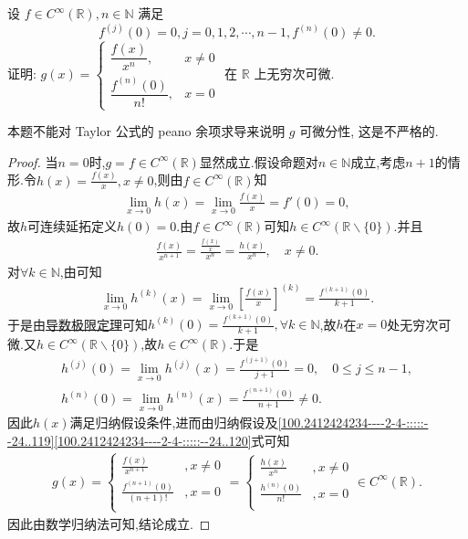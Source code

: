 \documentclass[../../main.tex]{subfiles}%
\begin{document}
\begin{example}
设 $f \in C^\infty(\mathbb{R}), n \in \mathbb{N}$ 满足
\[
f^{(j)}(0) = 0, j = 0, 1, 2, \cdots, n - 1, f^{(n)}(0) \neq 0.
\]
证明: \( g(x) = \begin{cases} 
\dfrac{f(x)}{x^n}, & x \neq 0 \\
\dfrac{f^{(n)}(0)}{n!}, & x = 0 
\end{cases} \) 在 $\mathbb{R}$ 上无穷次可微.
\end{example}
\begin{note}
本题不能对 Taylor 公式的 peano 余项求导来说明 $g$ 可微分性, 这是不严格的.
\end{note}
\begin{proof}
当$n=0$时,$g=f\in C^{\infty}(\mathbb{R})$显然成立.假设命题对$n\in \mathbb{N}$成立,考虑$n+1$的情形.令$h(x)=\frac{f(x)}{x},x\neq 0$,则由$f\in C^{\infty}(\mathbb{R})$知
\begin{align*}
\lim_{x\to 0}h(x)=\lim_{x\to 0}\frac{f(x)}{x} = f'(0)=0,
\end{align*}
故$h$可连续延拓定义$h(0)=0$.由$f\in C^{\infty}(\mathbb{R})$可知$h\in C^{\infty}(\mathbb{R}\backslash \{0\})$.并且
\begin{align}
\frac{f(x)}{x^{n+1}}=\frac{\frac{f(x)}{x}}{x^n}=\frac{h(x)}{x^n},\quad x\neq 0. \label{100.2412424234----2-4-:::::--24..119}
\end{align}
对$\forall k\in \mathbb{N}$,由可知
\begin{align*}
\lim_{x\rightarrow 0}h^{(k)}(x)=\lim_{x\rightarrow 0}\left[ \frac{f(x)}{x} \right]^{(k)}=\frac{f^{(k+1)}(0)}{k+1}.
\end{align*}
于是由\hyperref[theorem:导数极限定理]{导数极限定理}可知$h^{(k)}(0)=\frac{f^{(k+1)}(0)}{k+1},\forall k\in \mathbb{N}$,故$h$在$x=0$处无穷次可微.又$h\in C^{\infty}(\mathbb{R}\backslash \{0\})$,故$h\in C^{\infty}(\mathbb{R})$.于是
\begin{gather}
h^{(j)}(0)=\lim_{x\rightarrow 0}h^{(j)}(x)=\frac{f^{(j+1)}(0)}{j+1}=0,\quad 0\leqslant j\leqslant n-1,\nonumber \\
h^{(n)}(0)=\lim_{x\rightarrow 0}h^{(n)}(x)=\frac{f^{(n+1)}(0)}{n+1}\ne 0. \label{100.2412424234----2-4-:::::--24..120}
\end{gather}
因此$h(x)$满足归纳假设条件,进而由归纳假设及\eqref{100.2412424234----2-4-:::::--24..119}\eqref{100.2412424234----2-4-:::::--24..120}式可知
\begin{align*}
g(x)=\begin{cases}
\frac{f(x)}{x^{n+1}}&,x\ne 0\\
\frac{f^{(n+1)}(0)}{(n+1)!}&,x=0\\
\end{cases}=\begin{cases}
\frac{h(x)}{x^n}&,x\ne 0\\
\frac{h^{(n)}(0)}{n!}&,x=0\\
\end{cases}\in C^{\infty}(\mathbb{R}).
\end{align*}
因此由数学归纳法可知,结论成立.
\end{proof}
\end{document}
